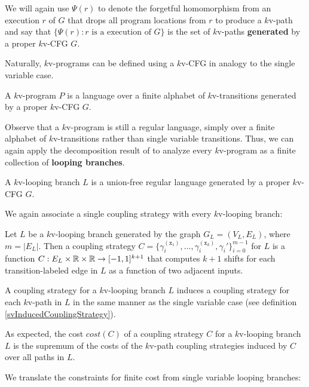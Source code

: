 We will again use $\Psi(r)$ to denote the forgetful homomorphism from an execution $r$ of $G$ that drops all program locations from $r$ to produce a $k$v-path and say that $\{\Psi(r): r\text{ is a execution of }G\}$ is the set of $k$v-paths \textbf{generated} by a proper $k$v-CFG $G$. 

Naturally, $k$v-programs can be defined using a $k$v-CFG in analogy to the single variable case. 

\begin{defn}
    A $k$v-program $P$ is a language over a finite alphabet of $k$v-transitions generated by a proper $k$v-CFG $G$. 
\end{defn}

Observe that a $k$v-program is still a regular language, simply over a finite alphabet of $k$v-transitions rather than single variable transitions. Thus, we can again apply the decomposition result of \cite{afoninMinimalUnionFreeDecompositions2009} to analyze every $k$v-program as a finite collection of \textbf{looping branches}.

\begin{defn}
    A $k$v-looping branch $L$ is a union-free regular language generated by a proper $k$v-CFG $G$. 
\end{defn}

We again associate a single coupling strategy with every $k$v-looping branch:

\begin{defn}
    Let $L$ be a $k$v-looping branch generated by the graph $G_L = (V_L, E_L)$, where $m = |E_L|$. Then a coupling strategy $C = \{\gamma_i^{(\texttt{x}_1)},\ldots, \gamma_i^{(\texttt{x}_k)}, \gamma_i'\}_{i=0}^{m-1}$ for $L$ is a function $C:E_L\times\mathbb{R} \times\mathbb{R}\to [-1, 1]^{k+1}$ that computes $k+1$ shifts for each transition-labeled edge in $L$ as a function of two adjacent inputs.
\end{defn}

A coupling strategy for a $k$v-looping branch $L$ induces a coupling strategy for each $k$v-path in $L$ in the same manner as the single variable case (see definition \ref{svInducedCouplingStrategy}). 

As expected, the cost $cost(C)$ of a coupling strategy $C$ for a $k$v-looping branch $L$ is the supremum of the costs of the $k$v-path coupling strategies induced by $C$ over all paths in $L$.

We translate the constraints for finite cost from single variable looping branches: 

